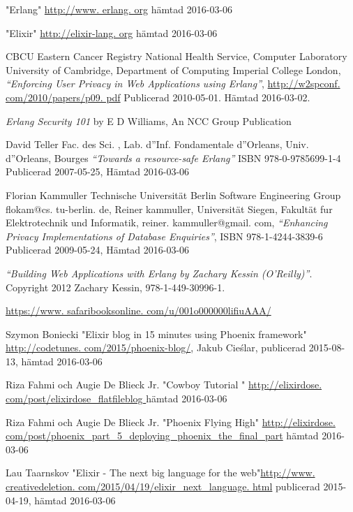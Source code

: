 \documentclass[12pt]{article}
\begin{document}
\begin{thebibliography}{99}

	"Erlang" \url{http://www.
erlang.
org}
hämtad 2016-03-06

"Elixir" \url{http://elixir-lang.
org}
hämtad 2016-03-06

 CBCU Eastern Cancer Registry National Health Service, Computer Laboratory University of Cambridge, Department of Computing Imperial College London, {\em “Enforcing User Privacy in Web Applications using Erlang”}, \url{http://w2spconf.
com/2010/papers/p09.
pdf} Publicerad 2010-05-01.
 Hämtad 2016-03-02.


 {\em Erlang Security 101} by E D Williams, An NCC Group Publication


David Teller Fac.
 des Sci.
, Lab.
 d''Inf.
 Fondamentale d''Orleans, Univ.
 d''Orleans, Bourges {\em “Towards a resource-safe Erlang”} ISBN 978-0-9785699-1-4 Publicerad 2007-05-25, Hämtad 2016-03-06			
					
Florian Kammuller Technische Universität Berlin Software Engineering Group flokam@cs.
tu-berlin.
de, Reiner kammuller, Universität Siegen, Fakultät fur Elektrotechnik und Informatik, reiner.
kammuller@gmail.
com, {\em “Enhancing Privacy Implementations of Database Enquiries”}, ISBN 978-1-4244-3839-6 Publicerad 2009-05-24, Hämtad 2016-03-06


 {\em “Building Web Applications with Erlang by Zachary Kessin (O’Reilly)”}.
 Copyright 2012 Zachary Kessin, 978-1-449-30996-1.

\url{https://www.
safaribooksonline.
com/u/001o000000lifiuAAA/}

 Szymon Boniecki "Elixir blog in 15 minutes using Phoenix framework" \url{http://codetunes.
com/2015/phoenix-blog/}, Jakub Cieślar, publicerad 2015-08-13,
hämtad 2016-03-06

Riza Fahmi och Augie De Blieck Jr.
 "Cowboy Tutorial " \url{http://elixirdose.
com/post/elixirdose_flatfileblog }
hämtad 2016-03-06

Riza Fahmi och Augie De Blieck Jr.
  "Phoenix Flying High" \url{http://elixirdose.
com/post/phoenix_part_5_deploying_phoenix_the_final_part} 
hämtad 2016-03-06

 Lau Taarnskov "Elixir - The next big language for the web"\url{http://www.
creativedeletion.
com/2015/04/19/elixir_next_language.
html}
publicerad  2015-04-19,
hämtad 2016-03-06




\end{thebibliography}
\end{document}
